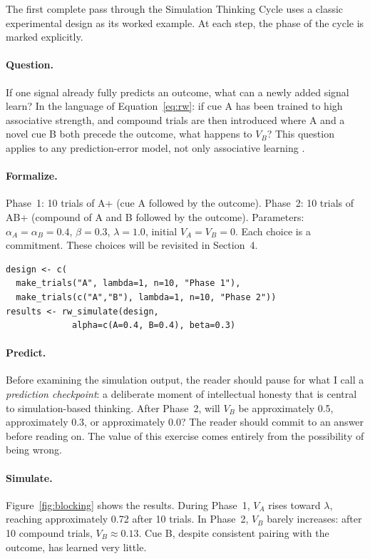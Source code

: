 \documentclass[fleqn,10pt]{wlscirep}
\begin{document}
\begin{linenumbers}
The first complete pass through the Simulation Thinking Cycle uses a classic experimental design as its worked example. At each step, the phase of the cycle is marked explicitly.

\paragraph{Question.} If one signal already fully predicts an outcome, what can a newly added signal learn? In the language of Equation~\ref{eq:rw}: if cue A has been trained to high associative strength, and compound trials are then introduced where A and a novel cue B both precede the outcome, what happens to $V_B$? This question applies to any prediction-error model, not only associative learning \citep{sutton2018reinforcement, courville2006bayesian}.

\paragraph{Formalize.} Phase~1: 10 trials of A+ (cue A followed by the outcome). Phase~2: 10 trials of AB+ (compound of A and B followed by the outcome). Parameters: $\alpha_A = \alpha_B = 0.4$, $\beta = 0.3$, $\lambda = 1.0$, initial $V_A = V_B = 0$. Each choice is a commitment. These choices will be revisited in Section~4.
\begin{verbatim}
design <- c(
  make_trials("A", lambda=1, n=10, "Phase 1"),
  make_trials(c("A","B"), lambda=1, n=10, "Phase 2"))
results <- rw_simulate(design,
             alpha=c(A=0.4, B=0.4), beta=0.3)
\end{verbatim}

\paragraph{Predict.} Before examining the simulation output, the reader should pause for what I call a \emph{prediction checkpoint}: a deliberate moment of intellectual honesty that is central to simulation-based thinking. After Phase~2, will $V_B$ be approximately 0.5, approximately 0.3, or approximately 0.0? The reader should commit to an answer before reading on. The value of this exercise comes entirely from the possibility of being wrong.

\paragraph{Simulate.} Figure~\ref{fig:blocking} shows the results. During Phase~1, $V_A$ rises toward $\lambda$, reaching approximately 0.72 after 10 trials. In Phase~2, $V_B$ barely increases: after 10 compound trials, $V_B \approx 0.13$. Cue B, despite consistent pairing with the outcome, has learned very little.


\end{linenumbers}
\end{document}
